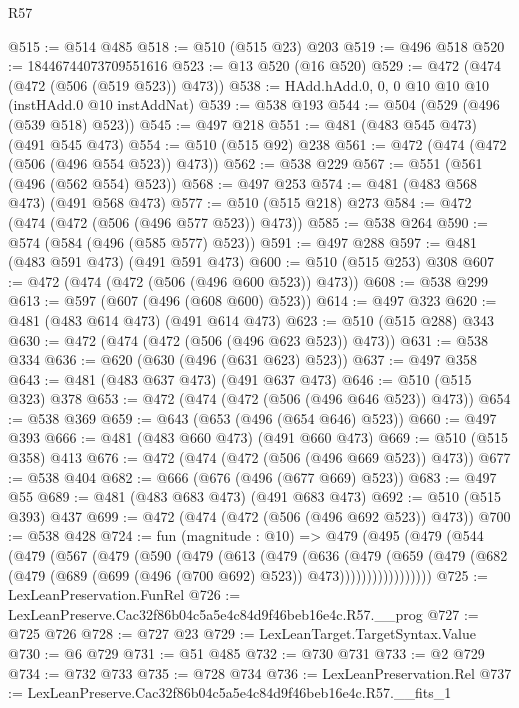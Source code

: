 \begin{lexlean}{R57}
\begin{coremodule}
@515 := @514 @485
@518 := @510 (@515 @23) @203
@519 := @496 @518
@520 := 18446744073709551616
@523 := @13 @520 (@16 @520)
@529 := @472 (@474 (@472 (@506 (@519 @523)) @473))
@538 := HAdd.hAdd.{0, 0, 0} @10 @10 @10 (instHAdd.{0} @10 instAddNat)
@539 := @538 @193
@544 := @504 (@529 (@496 (@539 @518) @523))
@545 := @497 @218
@551 := @481 (@483 @545 @473) (@491 @545 @473)
@554 := @510 (@515 @92) @238
@561 := @472 (@474 (@472 (@506 (@496 @554 @523)) @473))
@562 := @538 @229
@567 := @551 (@561 (@496 (@562 @554) @523))
@568 := @497 @253
@574 := @481 (@483 @568 @473) (@491 @568 @473)
@577 := @510 (@515 @218) @273
@584 := @472 (@474 (@472 (@506 (@496 @577 @523)) @473))
@585 := @538 @264
@590 := @574 (@584 (@496 (@585 @577) @523))
@591 := @497 @288
@597 := @481 (@483 @591 @473) (@491 @591 @473)
@600 := @510 (@515 @253) @308
@607 := @472 (@474 (@472 (@506 (@496 @600 @523)) @473))
@608 := @538 @299
@613 := @597 (@607 (@496 (@608 @600) @523))
@614 := @497 @323
@620 := @481 (@483 @614 @473) (@491 @614 @473)
@623 := @510 (@515 @288) @343
@630 := @472 (@474 (@472 (@506 (@496 @623 @523)) @473))
@631 := @538 @334
@636 := @620 (@630 (@496 (@631 @623) @523))
@637 := @497 @358
@643 := @481 (@483 @637 @473) (@491 @637 @473)
@646 := @510 (@515 @323) @378
@653 := @472 (@474 (@472 (@506 (@496 @646 @523)) @473))
@654 := @538 @369
@659 := @643 (@653 (@496 (@654 @646) @523))
@660 := @497 @393
@666 := @481 (@483 @660 @473) (@491 @660 @473)
@669 := @510 (@515 @358) @413
@676 := @472 (@474 (@472 (@506 (@496 @669 @523)) @473))
@677 := @538 @404
@682 := @666 (@676 (@496 (@677 @669) @523))
@683 := @497 @55
@689 := @481 (@483 @683 @473) (@491 @683 @473)
@692 := @510 (@515 @393) @437
@699 := @472 (@474 (@472 (@506 (@496 @692 @523)) @473))
@700 := @538 @428
@724 := fun (magnitude : @10) =>
  @479
    (@495
      (@479
        (@544
          (@479
            (@567
              (@479
                (@590
                  (@479
                    (@613
                      (@479
                        (@636
                          (@479
                            (@659
                              (@479
                                (@682
                                  (@479 (@689 (@699 (@496 (@700 @692) @523)) @473)))))))))))))))))
@725 := LexLeanPreservation.FunRel
@726 := LexLeanPreserve.Cac32f86b04c5a5e4c84d9f46beb16e4c.R57.__prog
@727 := @725 @726
@728 := @727 @23
@729 := LexLeanTarget.TargetSyntax.Value
@730 := @6 @729
@731 := @51 @485
@732 := @730 @731
@733 := @2 @729
@734 := @732 @733
@735 := @728 @734
@736 := LexLeanPreservation.Rel
@737 := LexLeanPreserve.Cac32f86b04c5a5e4c84d9f46beb16e4c.R57.__fits_1

\end{coremodule}
\end{lexlean}
